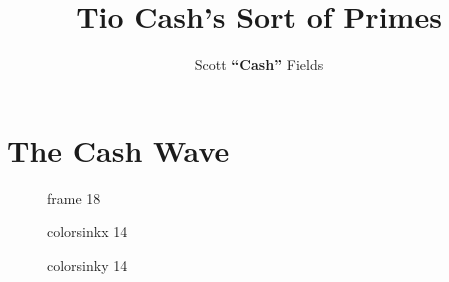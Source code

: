 \documentclass[12pt,letterpaper,oneside,titlepage]{article}
\begin{document}
\author{Scott \textbf{``Cash''} Fields}
\title{Tio Cash's Sort of Primes}
\maketitle



\section{The Cash Wave}

\begin{figure}[h]
%
{frame}%
{1}{8}%

\end{figure}




\begin{figure}[h]
    {colorsinkx}%
    {1}{4}%
    
\end{figure}



\begin{figure}[h]
    {colorsinky}%
    {1}{4}%
    
\end{figure}
\end{document}
